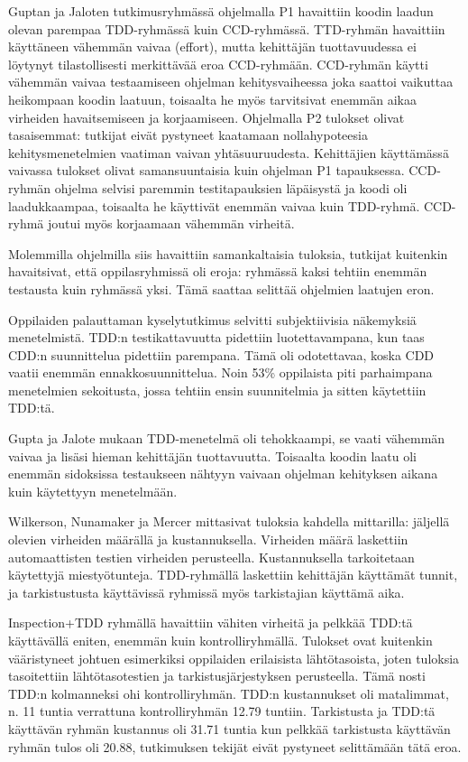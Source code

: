 \documentclass[finnish]{tktltiki2}
\theoremstyle{definition}
\theoremstyle{remark}
\begin{document}
Guptan ja Jaloten tutkimusryhmässä ohjelmalla P1 havaittiin koodin laadun olevan parempaa TDD-ryhmässä kuin CCD-ryhmässä. TTD-ryhmän havaittiin käyttäneen vähemmän vaivaa (effort), mutta kehittäjän tuottavuudessa ei löytynyt tilastollisesti merkittävää eroa CCD-ryhmään. CCD-ryhmän käytti vähemmän vaivaa testaamiseen ohjelman kehitysvaiheessa joka saattoi vaikuttaa heikompaan koodin laatuun, toisaalta he myös tarvitsivat enemmän aikaa virheiden havaitsemiseen ja korjaamiseen. 
Ohjelmalla P2 tulokset olivat tasaisemmat: tutkijat eivät pystyneet kaatamaan nollahypoteesia kehitysmenetelmien vaatiman vaivan yhtäsuuruudesta. Kehittäjien käyttämässä vaivassa tulokset olivat samansuuntaisia kuin ohjelman P1 tapauksessa. CCD-ryhmän ohjelma selvisi paremmin testitapauksien läpäisystä ja koodi oli laadukkaampaa, toisaalta he käyttivät enemmän vaivaa kuin TDD-ryhmä. CCD-ryhmä joutui myös korjaamaan vähemmän virheitä.

Molemmilla ohjelmilla siis havaittiin samankaltaisia tuloksia, tutkijat kuitenkin havaitsivat, että oppilasryhmissä oli eroja: ryhmässä kaksi tehtiin enemmän testausta kuin ryhmässä yksi. Tämä saattaa selittää ohjelmien laatujen eron. 

Oppilaiden palauttaman kyselytutkimus selvitti subjektiivisia näkemyksiä menetelmistä. TDD:n testikattavuutta pidettiin luotettavampana, kun taas CDD:n suunnittelua pidettiin parempana. Tämä oli odotettavaa, koska CDD vaatii enemmän ennakkosuunnittelua. Noin 53\% oppilaista piti parhaimpana menetelmien sekoitusta, jossa tehtiin ensin suunnitelmia ja sitten käytettiin TDD:tä.

Gupta ja Jalote mukaan TDD-menetelmä oli tehokkaampi, se vaati vähemmän vaivaa ja lisäsi hieman kehittäjän tuottavuutta. Toisaalta koodin laatu oli enemmän sidoksissa testaukseen nähtyyn vaivaan ohjelman kehityksen aikana kuin käytettyyn menetelmään.

Wilkerson, Nunamaker ja Mercer mittasivat tuloksia kahdella mittarilla: jäljellä olevien virheiden määrällä ja kustannuksella. Virheiden määrä laskettiin automaattisten testien virheiden perusteella. Kustannuksella tarkoitetaan käytettyjä miestyötunteja. TDD-ryhmällä laskettiin kehittäjän käyttämät tunnit, ja tarkistustusta käyttävissä ryhmissä myös tarkistajian käyttämä aika.

Inspection+TDD ryhmällä havaittiin vähiten virheitä ja pelkkää TDD:tä käyttävällä eniten, enemmän kuin kontrolliryhmällä. Tulokset ovat kuitenkin vääristyneet johtuen esimerkiksi oppilaiden erilaisista lähtötasoista, joten tuloksia tasoitettiin lähtötasotestien ja tarkistusjärjestyksen perusteella. Tämä nosti TDD:n kolmanneksi ohi kontrolliryhmän. TDD:n kustannukset oli matalimmat, n. 11 tuntia verrattuna kontrolliryhmän 12.79 tuntiin. Tarkistusta ja TDD:tä käyttävän ryhmän kustannus oli 31.71 tuntia kun pelkkää tarkistusta käyttävän ryhmän tulos oli 20.88, tutkimuksen tekijät eivät pystyneet selittämään tätä eroa.
\end{document}
